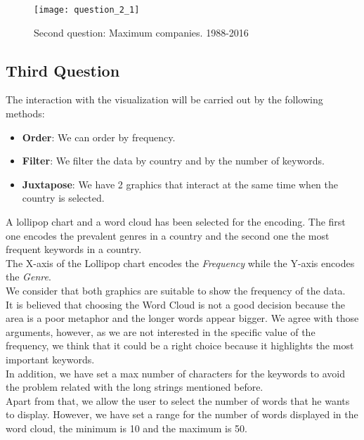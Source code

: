 \begin{figure}[H]
	\texttt{[image: question\_2\_1]}
	\caption{Second question: Maximum companies. 1988-2016}
	\label{fig:2nd_question_2}
\end{figure}

\subsection{Third Question}

The interaction with the visualization will be carried out by the following methods:

\begin{itemize}
	\item \textbf{Order}: We can order by frequency.
	\item \textbf{Filter}: We filter the data by country and by the number of keywords.
	\item \textbf{Juxtapose}: We have 2 graphics that interact at the same time when the country is selected.
\end{itemize}

A lollipop chart and a word cloud has been selected for the encoding. The first one encodes the prevalent genres in a country and the second one the most frequent keywords in a country.\\

The X-axis of the Lollipop chart encodes the \textit{Frequency} while the Y-axis encodes the \textit{Genre}.\\

We consider that both graphics are suitable to show the frequency of the data.\\

It is believed that choosing the Word Cloud is not a good decision because the area is a poor metaphor and the longer words appear bigger. We agree with those arguments, however, as we are not interested in the specific value of the frequency, we think that it could be a right choice because it highlights the most important keywords.\\

In addition, we have set a max number of characters for the keywords to avoid the problem related with the long strings mentioned before.\\

Apart from that, we allow the user to select the number of words that he wants to display. However, we have set a range for the number of words displayed in the word cloud, the minimum is 10 and the maximum is 50. \\

